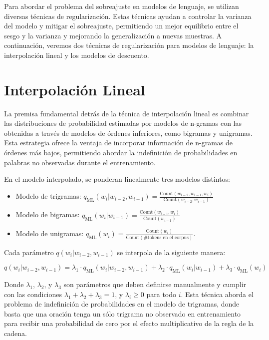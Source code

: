 Para abordar el problema del sobreajuste en modelos de lenguaje, se utilizan diversas técnicas de regularización. Estas técnicas ayudan a controlar la varianza del modelo y mitigar el sobreajuste, permitiendo un mejor equilibrio entre el sesgo y la varianza y mejorando la generalización a nuevas muestras. A continuación, veremos dos técnicas de regularización para modelos de lenguaje: la interpolación lineal y los modelos de descuento.




\section{Interpolación Lineal}

La premisa fundamental detrás de la técnica de interpolación lineal es combinar las distribuciones de probabilidad estimadas por modelos de n-gramas con las obtenidas a través de modelos de órdenes inferiores, como bigramas y unigramas. Esta estrategia ofrece la ventaja de incorporar información de n-gramas de órdenes más bajos, permitiendo abordar la indefinición de probabilidades en palabras no observadas durante el entrenamiento.

En el modelo interpolado, se ponderan linealmente tres modelos distintos:

\begin{itemize}
    \item Modelo de trigramas: $q_{\text{ML}}(w_i | w_{i-2}, w_{i-1}) = \frac{{\text{Count}(w_{i-2}, w_{i-1}, w_i)}}{{\text{Count}(w_{i-2}, w_{i-1})}}$ 
    \item Modelo de bigramas: $q_{\text{ML}}(w_i | w_{i-1}) = \frac{{\text{Count}(w_{i-1}, w_i)}}{{\text{Count}(w_{i-1})}}$ 
    \item Modelo de unigramas: $q_{\text{ML}}(w_i) = \frac{{\text{Count}(w_i)}}{{\text{Count}(\# \text{tokens en el corpus})}}$. 
\end{itemize}

Cada parámetro $q(w_i | w_{i-2}, w_{i-1})$ se interpola de la siguiente manera:

\[
q(w_i | w_{i-2}, w_{i-1}) = \lambda_1 \cdot q_{\text{ML}}(w_i | w_{i-2}, w_{i-1}) + \lambda_2 \cdot q_{\text{ML}}(w_i | w_{i-1}) + \lambda_3 \cdot q_{\text{ML}}(w_i)
\]

Donde $\lambda_1$, $\lambda_2$, y $\lambda_3$ son parámetros que deben definirse manualmente y cumplir con las condiciones $\lambda_1 + \lambda_2 + \lambda_3 = 1$, y $\lambda_i \geq 0$ para todo $i$. Esta técnica aborda el problema de indefinición de probabilidades en el modelo de trigramas, donde basta que una oración tenga un sólo trigrama no observado en entrenamiento para recibir una probabilidad de cero por el efecto multiplicativo de la regla de la cadena. 


